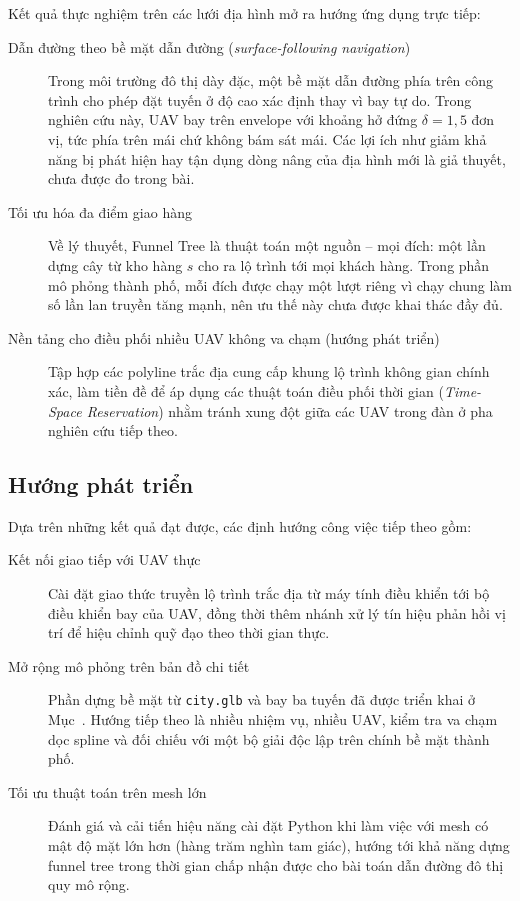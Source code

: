 Kết quả thực nghiệm trên các lưới địa hình mở ra hướng ứng dụng trực tiếp:
\begin{description}
  \item[Dẫn đường theo bề mặt dẫn đường (\emph{surface-following navigation})]
    Trong môi trường đô thị dày đặc, một bề mặt dẫn đường phía trên công trình cho
    phép đặt tuyến ở độ cao xác định thay vì bay tự do. Trong nghiên cứu này, UAV
    bay trên envelope với khoảng hở đứng $\delta=1{,}5$ đơn vị, tức phía trên mái
    chứ không bám sát mái. Các lợi ích như giảm khả năng bị phát hiện hay tận dụng
    dòng nâng của địa hình mới là giả thuyết, chưa được đo trong bài.
  \item[Tối ưu hóa đa điểm giao hàng] Về lý thuyết, Funnel Tree là thuật toán một
    nguồn -- mọi đích: một lần dựng cây từ kho hàng $s$ cho ra lộ trình tới mọi
    khách hàng. Trong phần mô phỏng thành phố, mỗi đích được chạy một lượt riêng
    vì chạy chung làm số lần lan truyền tăng mạnh, nên ưu thế này chưa được khai
    thác đầy đủ.
  \item[Nền tảng cho điều phối nhiều UAV không va chạm (hướng phát triển)] Tập hợp các polyline trắc
    địa cung cấp khung lộ trình không gian chính xác, làm tiền đề để áp dụng các
    thuật toán điều phối thời gian (\emph{Time-Space Reservation}) nhằm tránh xung
    đột giữa các UAV trong đàn ở pha nghiên cứu tiếp theo.
\end{description}

\subsection{Hướng phát triển}

Dựa trên những kết quả đạt được, các định hướng công việc tiếp theo gồm:
\begin{description}
  \item[Kết nối giao tiếp với UAV thực] Cài đặt giao thức truyền lộ trình trắc địa
    từ máy tính điều khiển tới bộ điều khiển bay của UAV, đồng thời thêm nhánh xử
    lý tín hiệu phản hồi vị trí để hiệu chỉnh quỹ đạo theo thời gian thực.
  \item[Mở rộng mô phỏng trên bản đồ chi tiết] Phần dựng bề mặt từ
    \texttt{city.glb} và bay ba tuyến đã được triển khai ở Mục~.
    Hướng tiếp theo là nhiều nhiệm vụ, nhiều UAV, kiểm tra va chạm dọc spline và
    đối chiếu với một bộ giải độc lập trên chính bề mặt thành phố.
  \item[Tối ưu thuật toán trên mesh lớn] Đánh giá và cải tiến hiệu năng cài đặt
    Python khi làm việc với mesh có mật độ mặt lớn hơn (hàng trăm nghìn tam giác),
    hướng tới khả năng dựng funnel tree trong thời gian chấp nhận được cho bài
    toán dẫn đường đô thị quy mô rộng.
\end{description}
